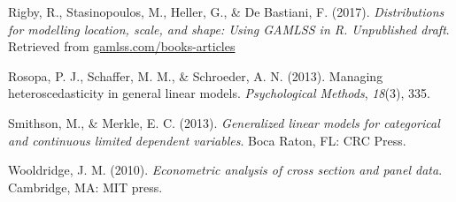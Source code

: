 \documentclass[english,man]{apa6}
\theoremstyle{definition}
\theoremstyle{definition}
\theoremstyle{remark}
\begin{document}
\hypertarget{ref-rigby2017distributions}{}
Rigby, R., Stasinopoulos, M., Heller, G., \& De Bastiani, F. (2017).
\emph{Distributions for modelling location, scale, and shape: Using
GAMLSS in R. Unpublished draft}. Retrieved from
\url{gamlss.com/books-articles}

\hypertarget{ref-rosopa2013managing}{}
Rosopa, P. J., Schaffer, M. M., \& Schroeder, A. N. (2013). Managing
heteroscedasticity in general linear models. \emph{Psychological
Methods}, \emph{18}(3), 335.

\hypertarget{ref-smithson2013generalized}{}
Smithson, M., \& Merkle, E. C. (2013). \emph{Generalized linear models
for categorical and continuous limited dependent variables}. Boca Raton,
FL: CRC Press.

\hypertarget{ref-wooldridge2010econometric}{}
Wooldridge, J. M. (2010). \emph{Econometric analysis of cross section
and panel data}. Cambridge, MA: MIT press.
\end{document}
